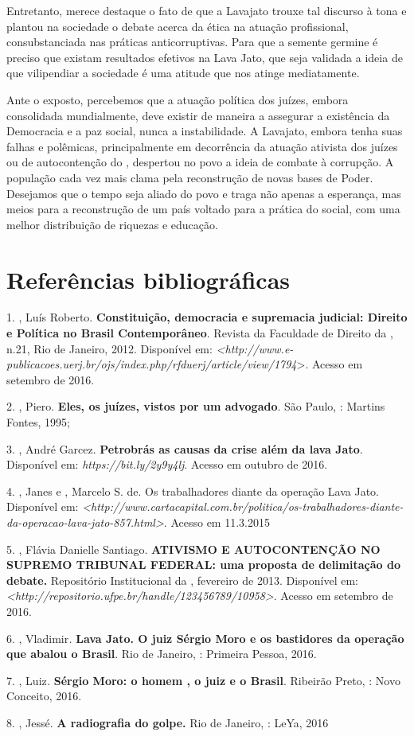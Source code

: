 Entretanto, merece destaque o fato de que a Lavajato trouxe tal discurso
à tona e plantou na sociedade o debate acerca da ética na atuação
profissional, consubstanciada nas práticas anticorruptivas. Para que a
semente germine é preciso que existam resultados efetivos na Lava Jato,
que seja validada a ideia de que vilipendiar a sociedade é uma atitude
que nos atinge mediatamente.

Ante o exposto, percebemos que a atuação política dos juízes, embora
consolidada mundialmente, deve existir de maneira a assegurar a
existência da Democracia e a paz social, nunca a instabilidade. A
Lavajato, embora tenha suas falhas e polêmicas, principalmente em
decorrência da atuação ativista dos juízes ou de autocontenção do ,
despertou no povo a ideia de combate à corrupção. A população cada vez
mais clama pela reconstrução de novas bases de Poder. Desejamos que o
tempo seja aliado do povo e traga não apenas a esperança, mas meios para
a reconstrução de um país voltado para a prática do social, com uma
melhor distribuição de riquezas e educação.

\section{Referências bibliográficas}

1. , Luís Roberto. \textbf{Constituição, democracia e
supremacia judicial: Direito e Política no Brasil Contemporâneo}.
Revista da Faculdade de Direito da , n.21, Rio de Janeiro, 2012.
Disponível em:
\emph{\textless{}http://www.e-publicacoes.uerj.br/ojs/index.php/rfduerj/article/view/1794}\textgreater{}.
Acesso em setembro de 2016.

2. , Piero. \textbf{Eles, os juízes, vistos por um advogado}.
São Paulo, : Martins Fontes, 1995;

3. , André Garcez. \textbf{Petrobrás as causas da crise além da
lava Jato}. Disponível em:
\emph{https://bit.ly/2y9y4lj}.
Acesso em outubro de 2016.

4. , Janes e , Marcelo S. de. Os trabalhadores diante da
operação Lava Jato. Disponível em:
\emph{\textless{}http://www.cartacapital.com.br/politica/os-trabalhadores-diante-da-operacao-lava-jato-857.html\textgreater{}}.
Acesso em 11.3.2015

5. , Flávia Danielle Santiago. \textbf{ATIVISMO E AUTOCONTENÇÃO NO
SUPREMO TRIBUNAL FEDERAL: uma proposta de delimitação do debate.}
Repositório Institucional da , fevereiro de 2013. Disponível em:
\emph{\textless{}http://repositorio.ufpe.br/handle/123456789/10958\textgreater{}}.
Acesso em setembro de 2016.

6. , Vladimir\emph{.} \textbf{Lava Jato. O juiz Sérgio Moro e os
bastidores da operação que abalou o Brasil}. Rio de Janeiro, :
Primeira Pessoa, 2016.

7. , Luiz\emph{.} \textbf{Sérgio Moro: o homem , o juiz e o
Brasil}. Ribeirão Preto, : Novo Conceito, 2016.

8. , Jessé. \textbf{A radiografia do golpe.} Rio de Janeiro, :
LeYa, 2016
